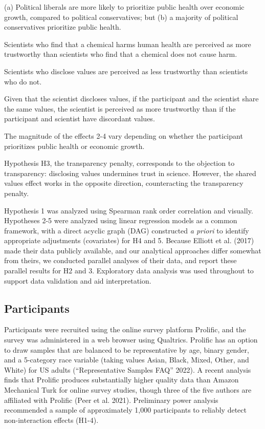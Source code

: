\documentclass[
  letterpaper,
  DIV=11,
  numbers=noendperiod]{scrartcl}
\providecommand{\tightlist}{%
  \setlength{\itemsep}{0pt}\setlength{\parskip}{0pt}}\usepackage{longtable,booktabs,array}
\begin{document}
\begin{description}
\tightlist
\item[H1. Modest correlation between values and ideology]
(a) Political liberals are more likely to prioritize public health over
economic growth, compared to political conservatives; but (b) a majority
of political conservatives prioritize public health.
\item[H2. Consumer risk sensitivity]
Scientists who find that a chemical harms human health are perceived as
more trustworthy than scientists who find that a chemical does not cause
harm.
\item[H3. Transparency penalty]
Scientists who disclose values are perceived as less trustworthy than
scientists who do not.
\item[H4. Shared values]
Given that the scientist discloses values, if the participant and the
scientist share the same values, the scientist is perceived as more
trustworthy than if the participant and scientist have discordant
values.
\item[H5. Variation in effects]
The magnitude of the effects 2-4 vary depending on whether the
participant prioritizes public health or economic growth.
\end{description}

Hypothesis H3, the transparency penalty, corresponds to the objection to
transparency: disclosing values undermines trust in science. However,
the shared values effect works in the opposite direction, counteracting
the transparency penalty.

Hypothesis 1 was analyzed using Spearman rank order correlation and
visually. Hypotheses 2-5 were analyzed using linear regression models as
a common framework, with a direct acyclic graph (DAG) constructed
\emph{a priori} to identify appropriate adjustments (covariates) for H4
and 5. Because Elliott et al. (2017) made their data publicly available,
and our analytical approaches differ somewhat from theirs, we conducted
parallel analyses of their data, and report these parallel results for
H2 and 3. Exploratory data analysis was used throughout to support data
validation and aid interpretation.

\hypertarget{participants}{%
\subsection{Participants}\label{participants}}

Participants were recruited using the online survey platform Prolific,
and the survey was administered in a web browser using Qualtrics.
Prolific has an option to draw samples that are balanced to be
representative by age, binary gender, and a 5-category race variable
(taking values Asian, Black, Mixed, Other, and White) for US adults
({``Representative Samples FAQ''} 2022). A recent analysis finds that
Prolific produces substantially higher quality data than Amazon
Mechanical Turk for online survey studies, though three of the five
authors are affiliated with Prolific (Peer et al. 2021). Preliminary
power analysis recommended a sample of approximately 1,000 participants
to reliably detect non-interaction effects (H1-4).
\end{document}
